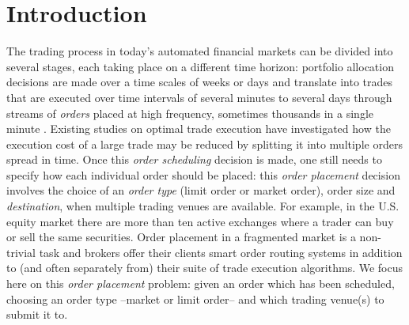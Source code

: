 \documentclass[opre,nonblindrev]{informs3}
\begin{document}


\maketitle



\newpage


\section{Introduction}

The trading process in today's automated financial markets can be divided into several stages, each taking place on a different time horizon: portfolio allocation decisions are  made over a time scales of weeks or days  and translate into trades that are executed over time intervals of several minutes to several days through streams of {\it orders} placed at high frequency, sometimes thousands in a single minute \citep{Cont2011}. Existing studies on optimal trade execution have investigated how the execution cost of a large trade may be reduced by splitting it into multiple orders spread in time.
Once this {\it order scheduling } decision is made, one still needs to specify how each individual order should be  placed: this {\it order placement} decision involves the choice of an {\it order type} (limit order or market order), order size and  {\it destination}, when multiple trading venues are available. For example, in the U.S. equity market there are more than ten active exchanges where a trader can buy or sell the same securities. Order placement in a fragmented market is a non-trivial task and brokers offer their clients smart order routing systems in addition to (and often separately from) their suite of trade execution algorithms. We focus here on this {\it order placement} problem: given an order which has been scheduled, choosing an order type --market or limit order-- and which trading venue(s) to submit it to.
\end{document}
